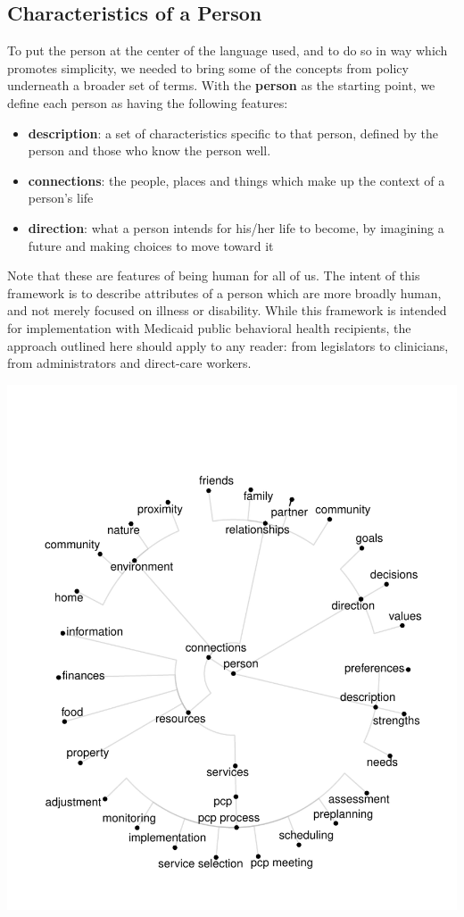 \documentclass[
]{book}
\providecommand{\tightlist}{%
  \setlength{\itemsep}{0pt}\setlength{\parskip}{0pt}}
\begin{document}
\hypertarget{characteristics-of-a-person}{%
\subsection{Characteristics of a Person}\label{characteristics-of-a-person}}

To put the person at the center of the language used, and to do so in way which promotes simplicity, we needed to bring some of the concepts from policy underneath a broader set of terms. With the \textbf{person} as the starting point, we define each person as having the following features:

\begin{itemize}
\tightlist
\item
  \textbf{description}: a set of characteristics specific to that person, defined by the person and those who know the person well.
\item
  \textbf{connections}: the people, places and things which make up the context of a person's life
\item
  \textbf{direction}: what a person intends for his/her life to become, by imagining a future and making choices to move toward it
\end{itemize}

Note that these are features of being human for all of us. The intent of this framework is to describe attributes of a person which are more broadly human, and not merely focused on illness or disability. While this framework is intended for implementation with Medicaid public behavioral health recipients, the approach outlined here should apply to any reader: from legislators to clinicians, from administrators and direct-care workers.

\includegraphics{person_centered_files/figure-latex/unnamed-chunk-8-1.pdf}
\end{document}
